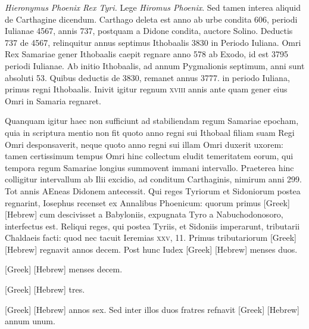 \begin{parnumbers}
\textit{Hieronymus Phoenix Rex Tyri.}
\lnr{}Lege \textit{Hiromus Phoenix}.
\lnr{}Sed tamen interea aliquid de Carthagine
dicendum.
\lnr{}Carthago deleta est anno ab urbe condita 606,
periodi Iulianae 4567, annis 737, postquam a Didone condita,
auctore Solino.
\lnr{}Deductis 737 de 4567, relinquitur annus
septimus Ithobaalis 3830 in Periodo Iuliana.
\lnr{}Omri Rex Samariae
gener Ithobaalis caepit regnare anno 578 ab Exodo, id
est 3795 periodi Iulianae.
\lnr{}Ab initio Ithobaalis, ad annum Pygmalionis
septimum, anni sunt absoluti 53.
\lnr{}Quibus deductis de
3830, remanet annus 3777. in periodo Iuliana, primus regni
Ithobaalis.
\lnr{}Inivit igitur regnum \textsc{xviii} annis ante quam gener eius
Omri in Samaria regnaret.

{}
\lnr{}Quanquam igitur haec non sufficiunt
ad stabiliendam regum Samariae epocham, quia in scriptura mentio
non fit quoto anno regni sui Ithobaal filiam suam Regi Omri desponsaverit,
neque quoto anno regni sui illam Omri duxerit uxorem:
tamen certissimum tempus Omri hinc collectum eludit temeritatem
eorum, qui tempora regum Samariae longius summovent
immani intervallo.
\lnr{}Praeterea hinc colligitur intervallum
ab Ilii excidio, ad conditum Carthaginis, nimirum anni 299.
\lnr{}Tot annis AEneas Didonem antecessit.
\lnr{}Qui reges Tyriorum et Sidoniorum
postea regnarint, Iosephus recenset ex Annalibus Phoenicum:
quorum primus \textgreek{[Greek]} \texthebrew{[Hebrew]}
 cum descivisset a Babyloniis,
expugnata Tyro a Nabuchodonosoro, interfectus est.
\lnr{}Reliqui reges, qui postea Tyriis, et Sidoniis imperarunt, tributarii
Chaldaeis facti: quod nec tacuit Ieremias \textsc{xxv}, 11.
\lnr{}Primus
tributariorum \textgreek{[Greek]} \texthebrew{[Hebrew]} regnavit annos decem.
\lnr{}Post hunc Iudex
\textgreek{[Greek]} \texthebrew{[Hebrew]} menses duos.

\textgreek{[Greek]} \texthebrew{[Hebrew]} menses decem.

\textgreek{[Greek]} \texthebrew{[Hebrew]} tres.

\textgreek{[Greek]} \texthebrew{[Hebrew]}
annos sex.
\lnr{}Sed inter illos duos fratres refnavit \textgreek{[Greek]} \texthebrew{[Hebrew]}
annum unum.


\end{parnumbers}
